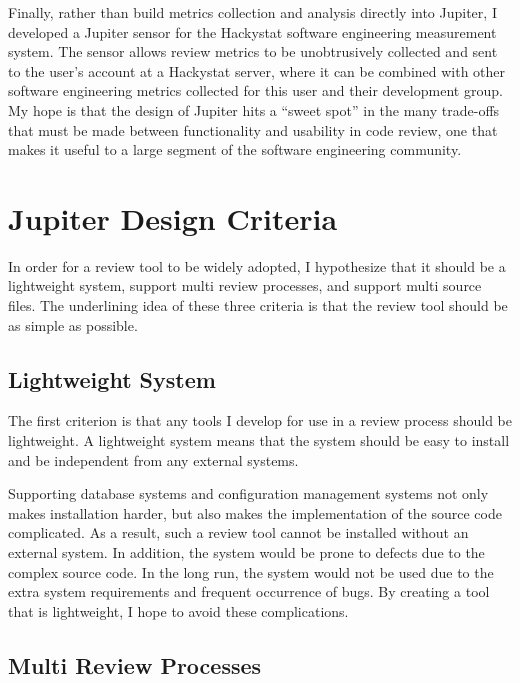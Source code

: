 Finally, rather than build metrics collection and analysis directly into Jupiter, I developed a Jupiter sensor for the Hackystat software engineering measurement system. The sensor allows review metrics to be unobtrusively collected and sent to the user's account at a Hackystat server, where it can be combined with other software engineering metrics collected for this user and their development group. My hope is that the design of Jupiter hits a ``sweet spot'' in the many trade-offs that must be made between functionality and usability in code review, one that makes it useful to a large segment of the software engineering community.

\section{Jupiter Design Criteria}
\label{sec:jupiter-design-criteria}

In order for a review tool to be widely adopted, I hypothesize that it should be a lightweight system, support multi review processes, and support multi source files. The underlining idea of these three criteria is that the review tool should be as simple as possible.

\subsection{Lightweight System}
\label{subsec:lightweight-system}

The first criterion is that any tools I develop for use in a review process should be lightweight. A lightweight system means that the system should be easy to install and be independent from any external systems.

Supporting database systems and configuration management systems not only makes installation harder, but also makes the implementation of the source code complicated. As a result, such a review tool cannot be installed without an external system. In addition, the system would be prone to defects due to the complex source code. In the long run, the system would not be used due to the extra system requirements and frequent occurrence of bugs. By creating a tool that is lightweight, I hope to avoid these complications.

\subsection{Multi Review Processes}
\label{subsec:multi-review-processes}

